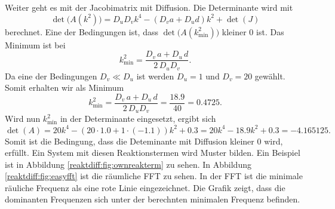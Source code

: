 Weiter geht es mit der Jacobimatrix mit Diffusion.
Die Determinante wird mit
\begin{equation*}
    \det\bigl(A(k^2)\bigr) = D_u D_v k^4 - (D_v a + D_u d) k^2 + \det(J)
\end{equation*}
berechnet.
Eine der Bedingungen ist, dass \( \det\bigl( A(k_{\min}^2)\bigr)\) kleiner 0 ist.
Das Minimum ist bei
\begin{equation*}
    k^2_{\text{min}} = \frac{D_v\, a + D_u \, d}{2\, D_u D_v}.
\end{equation*}
Da eine der Bedingungen \(D_v \ll D_u\) ist werden \(D_u = 1\) und \(D_v = 20\) gewählt.
Somit erhalten wir als Minimum
\begin{equation*}
    k^2_{\text{min}} = \frac{D_v\, a + D_u\, d}{2\, D_u D_v} = \frac{18.9}{40} = 0.4725.
\end{equation*}
Wird nun \(k^2_{\text{min}}\) in der Determinante eingesetzt, ergibt sich
\begin{equation*}
    \det(A) = 20k^4 - (20 \cdot 1.0 + 1 \cdot (-1.1))k^2 + 0.3 = 20k^4 - 18.9k^2 + 0.3
     = -4.165125 .
\end{equation*}
Somit ist die Bedingung, dass die Deteminante mit Diffusion kleiner 0 wird, erfüllt.
Ein System mit diesen Reaktionstermen wird Muster bilden.
Ein Beispiel ist in Abbildung \ref{reaktdiff:fig:ownreakterm} zu sehen.
In Abbildung \ref{reaktdiff:fig:easyfft} ist die räumliche FFT zu sehen.
In der FFT ist die minimale räuliche Frequenz als eine rote Linie eingezeichnet.
Die Grafik zeigt, dass die dominanten Frequenzen sich unter der berechnten minimalen Frequenz befinden.

